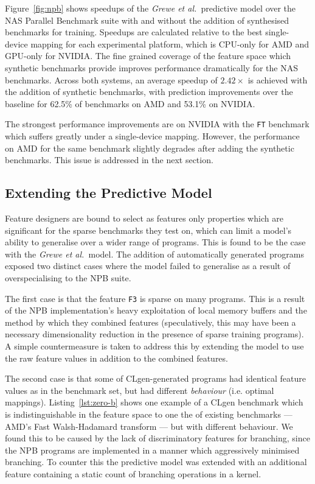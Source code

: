 Figure~\ref{fig:npb} shows speedups of the \emph{Grewe et al.\ }predictive model over the NAS Parallel Benchmark suite with and without the addition of synthesised benchmarks for training. Speedups are calculated relative to the best single-device mapping for each experimental platform, which is CPU-only for AMD and GPU-only for NVIDIA. The fine grained coverage of the feature space which synthetic benchmarks provide improves performance dramatically for the NAS benchmarks. Across both systems, an average speedup of $2.42\times$ is achieved with the addition of synthetic benchmarks, with prediction improvements over the baseline for 62.5\% of benchmarks on AMD and 53.1\% on NVIDIA.

The strongest performance improvements are on NVIDIA with the \texttt{FT} benchmark which suffers greatly under a single-device mapping. However, the performance on AMD for the same benchmark slightly degrades after adding the synthetic benchmarks. This issue is addressed in the next section.

\subsection{Extending the Predictive Model}
\label{subsec:eval-extended}

Feature designers are bound to select as features only properties which are significant for the sparse benchmarks they test on, which can limit a model's ability to generalise over a wider range of programs. This is found to be the case with the \emph{Grewe et al.\ }model. The addition of automatically generated programs exposed two distinct cases where the model failed to generalise as a result of overspecialising to the NPB suite.

The first case is that the feature \texttt{F3} is sparse on many programs. This is a result of the NPB implementation's heavy exploitation of local memory buffers and the method by which they combined features (speculatively, this may have been a necessary dimensionality reduction in the presence of sparse training programs). A simple countermeasure is taken to address this by extending the model to use the raw feature values in addition to the combined features.

The second case is that some of CLgen-generated programs had identical feature values as in the benchmark set, but had different \emph{behaviour} (i.e. optimal mappings). Listing~\ref{lst:zero-b} shows one example of a CLgen benchmark which is indistinguishable in the feature space to one the of existing benchmarks --- AMD's Fast Walsh-Hadamard transform --- but with different behaviour. We found this to be caused by the lack of discriminatory features for branching, since the NPB programs are implemented in a manner which aggressively minimised branching. To counter this the predictive model was extended with an additional feature containing a static count of branching operations in a kernel.

